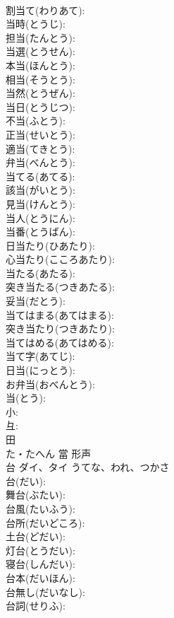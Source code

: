 \documentclass[8pt]{extreport}
\begin{document}
\begin{CJK}{UTF8}{min}
\\	割当て(わりあて): 
\\	当時(とうじ): 
\\	担当(たんとう): 
\\	当選(とうせん): 
\\	本当(ほんとう): 
\\	相当(そうとう): 
\\	当然(とうぜん): 
\\	当日(とうじつ): 
\\	不当(ふとう): 
\\	正当(せいとう): 
\\	適当(てきとう): 
\\	弁当(べんとう): 
\\	当てる(あてる): 
\\	該当(がいとう): 
\\	見当(けんとう): 
\\	当人(とうにん): 
\\	当番(とうばん): 
\\	日当たり(ひあたり): 
\\	心当たり(こころあたり): 
\\	当たる(あたる): 
\\	突き当たる(つきあたる): 
\\	妥当(だとう): 
\\	当てはまる(あてはまる): 
\\	突き当たり(つきあたり): 
\\	当てはめる(あてはめる): 
\\	当て字(あてじ): 
\\	日当(にっとう): 
\\	お弁当(おべんとう): 
\\	当(とう): 
\\	小: 
\\	彑: 
\\	田	
\\	た・たへん	當	形声 
\\	台	ダイ、タイ	うてな、われ、つかさ		
\\	台(だい): 
\\	舞台(ぶたい): 
\\	台風(たいふう): 
\\	台所(だいどころ): 
\\	土台(どだい): 
\\	灯台(とうだい): 
\\	寝台(しんだい): 
\\	台本(だいほん): 
\\	台無し(だいなし): 
\\	台詞(せりふ): 

\end{CJK}
\end{document}
